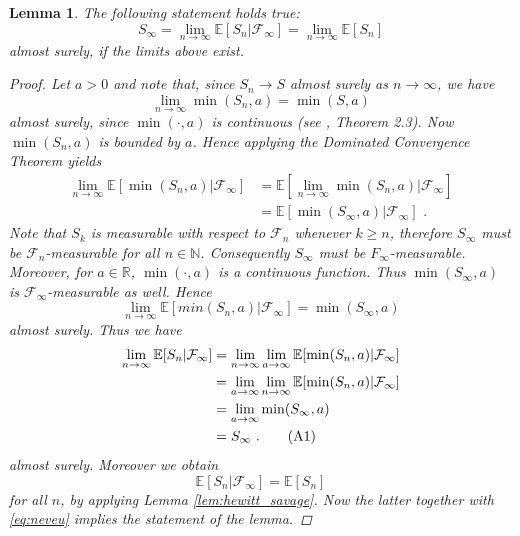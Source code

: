\documentclass[phd]{UWMThesis}
\newcommand\numberthis{\addtocounter{equation}{1}\tag{\theequation}}
\newcommand{\E}{\mathbb{E}}
\newcommand{\R}{\mathbb{R}}
\newcommand{\F}{\mathcal{F}}
\newcommand{\mdot}{\textrm{ .}}
\renewcommand{\.}{\textrm{ .}}
\newtheorem{lemma}[thm]{Lemma}
\theoremstyle{definition}
\numberwithin{thm}{chapter}
\begin{document}
\begin{lemma}
	The following statement holds true:
	$$S_\infty = \lim\limits_{n\to\infty} \E[S_n| \F_\infty] = \lim\limits_{n\to\infty}\E[S_n]$$
	almost surely, if the limits above exist.
	\label{lem:connector}
	
	\begin{proof}
		Let $a>0$ and note that, since $S_n\to S$ almost surely as $n\to\infty$, we have
		$$\lim\limits_{n\to\infty}\min(S_n, a) = \min(S,a)$$ 
		almost surely, since $\min(\cdot, a)$ is continuous (see \cite{van2000asymptotic}, Theorem 2.3). Now $\min(S_n,a)$ is bounded by $a$. Hence applying the Dominated Convergence Theorem yields
		\begin{align*}
		\lim\limits_{n\to\infty} \E[\min(S_n,a)|\F_\infty] &= \E[\lim\limits_{n\to\infty} \min(S_n,a)|\F_\infty] \nonumber\\
		&= \E[\min(S_\infty,a)|\F_\infty]\mdot
		\end{align*}
		Note that $S_k$ is measurable with respect to $\F_n$  whenever $k\geq n$, therefore $S_\infty$ must be $\F_n$-measurable for all $n\in\mathbb{N}$. Consequently $S_\infty$ must be $F_\infty$-measurable. Moreover, for $a\in\R$, $\min(\cdot,a)$ is a continuous function. Thus $\min(S_\infty,a)$ is $\F_\infty$-measurable as well. Hence
		$$\lim\limits_{n\to\infty}\E[min(S_n,a)|\F_\infty] = \min(S_\infty,a) $$
		almost surely. Thus we have
		\begin{align*}
		\lim\limits_{n\to\infty} \E[S_n|\F_\infty] &=  \lim\limits_{n\to\infty}\lim\limits_{a\to\infty}\E[\min(S_n,a)|\F_\infty]\\
		&= \lim\limits_{a\to\infty}\lim\limits_{n\to\infty}\E[\min(S_n,a)|\F_\infty]\\
		&= \lim\limits_{a\to\infty}\min(S_\infty,a)\\
		&= S_\infty\mdot \numberthis \label{eq:neveu}
		\end{align*}
		almost surely. Moreover we obtain
		$$\E[S_n| \F_\infty] = \E[S_n] $$
		for all $n$, by applying Lemma \ref{lem:hewitt_savage}. Now the latter together with \eqref{eq:neveu} implies the statement of the lemma.
	\end{proof}
\end{lemma}
%
%
%
%
%
	
	
	
\end{document}
